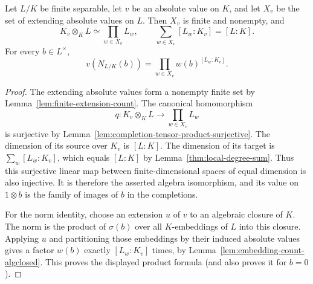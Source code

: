 \begin{proposition}\label{lem:local-factorization}
\leanok
{}
Let $L/K$ be finite separable, let $v$ be an absolute value on $K$, and
let $X_v$ be the set of extending absolute values on $L$. Then $X_v$ is
finite and nonempty, and
\[
 K_v\otimes_KL\simeq\prod_{w\in X_v}L_w,\qquad
 \sum_{w\in X_v}[L_w:K_v]=[L:K].
\]
For every $b\in L^\times$,
\[
 v(N_{L/K}(b))=\prod_{w\in X_v}w(b)^{[L_w:K_v]}.
\]
\end{proposition}
\begin{proof}
The extending absolute values form a nonempty finite set by
Lemma~\ref{lem:finite-extension-count}. The canonical homomorphism
\[
 q:K_v\otimes_KL\longrightarrow\prod_{w\in X_v}L_w
\]
is surjective by Lemma~\ref{lem:completion-tensor-product-surjective}.
The dimension of its source over $K_v$ is $[L:K]$. The dimension
of its target is $\sum_w[L_w:K_v]$, which equals $[L:K]$ by
Lemma~\ref{thm:local-degree-sum}. Thus this surjective linear map
between finite-dimensional spaces of equal dimension is also
injective. It is therefore the asserted algebra isomorphism, and
its value on $1\otimes b$ is the family of images of $b$ in the
completions.

For the norm identity, choose an extension $u$ of $v$ to an
algebraic closure of $K$. The norm is the product of $\sigma(b)$
over all $K$-embeddings of $L$ into this closure. Applying $u$ and
partitioning those embeddings by their induced absolute values
gives a factor $w(b)$ exactly $[L_w:K_v]$ times, by
Lemma~\ref{lem:embedding-count-algclosed}. This proves the displayed
product formula (and also proves it for $b=0$).
\end{proof}

